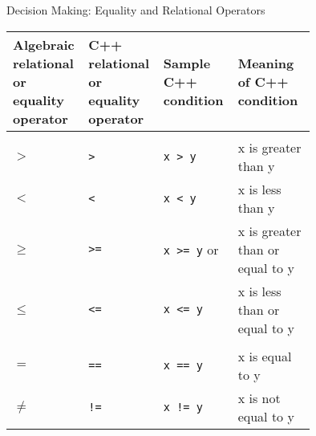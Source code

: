 \documentclass[10pt]{beamer}
\begin{document}
\begin{frame}{\small Decision Making: Equality and Relational Operators}
	\centering\tiny\renewcommand{\arraystretch}{2}
	\begin{tabular}{p{0.15\linewidth} p{0.15\linewidth} p{0.2\linewidth} p{0.25\linewidth}}
		
		\rowcolor{cyan}\color{white} Algebraic relational or equality operator & \color{white} C++ relational or equality operator & \color{white} Sample C++ condition & \color{white} Meaning of C++ condition \\\hline
		
		\rowcolor{lightcyan} \multicolumn{4}{l}{Relational operators} \\
		
		\rowcolor{lightcyan} $>$ & \texttt{>} & \texttt{x > y} & x is greater than y \\
		
		\rowcolor{lightcyan} $<$ & \texttt{<} & \texttt{x < y} & x is less than y \\
		
		\rowcolor{lightcyan} $\geq$ & \texttt{>=} & \texttt{x >= y} or & x is greater than or equal to y \\
		
		\rowcolor{lightcyan} $\leq$ & \texttt{<=} & \texttt{x <= y} & x is less than or equal to y \\\hline
		
		\rowcolor{lightcyan} \multicolumn{4}{l}{Equality operators} \\
		
		\rowcolor{lightcyan} $=$ & \texttt{==} & \texttt{x == y} & x is equal to y \\
		
		\rowcolor{lightcyan} $\neq$ & \texttt{!=} & \texttt{x != y} & x is not equal to y \\\hline
	\end{tabular}
\end{frame}


%
\end{document}

